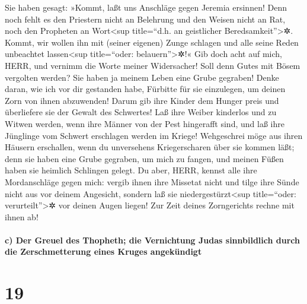 Sie haben gesagt: »Kommt, laßt uns Anschläge gegen
Jeremia ersinnen! Denn noch fehlt es den Priestern nicht an Belehrung
und den Weisen nicht an Rat, noch den Propheten an Wort\textless sup
title=``d.h. an geistlicher Beredsamkeit''\textgreater✲. Kommt, wir
wollen ihn mit (seiner eigenen) Zunge schlagen und alle seine Reden
unbeachtet lassen\textless sup title=``oder: belauern''\textgreater✲!«
Gib doch acht auf mich, HERR, und vernimm die Worte
meiner Widersacher! Soll denn Gutes mit Bösem vergolten
werden? Sie haben ja meinem Leben eine Grube gegraben! Denke daran, wie
ich vor dir gestanden habe, Fürbitte für sie einzulegen, um deinen Zorn
von ihnen abzuwenden! Darum gib ihre Kinder dem Hunger
preis und überliefere sie der Gewalt des Schwertes! Laß ihre Weiber
kinderlos und zu Witwen werden, wenn ihre Männer von der Pest hingerafft
sind, und laß ihre Jünglinge vom Schwert erschlagen werden im Kriege!
Wehgeschrei möge aus ihren Häusern erschallen, wenn du
unversehens Kriegerscharen über sie kommen läßt; denn sie haben eine
Grube gegraben, um mich zu fangen, und meinen Füßen haben sie heimlich
Schlingen gelegt. Du aber, HERR, kennst alle ihre
Mordanschläge gegen mich: vergib ihnen ihre Missetat nicht und tilge
ihre Sünde nicht aus vor deinem Angesicht, sondern laß sie
niedergestürzt\textless sup title=``oder: verurteilt''\textgreater✲ vor
deinen Augen liegen! Zur Zeit deines Zorngerichts rechne mit ihnen ab!

\hypertarget{c-der-greuel-des-thopheth-die-vernichtung-judas-sinnbildlich-durch-die-zerschmetterung-eines-kruges-angekuxfcndigt}{%
\paragraph{c) Der Greuel des Thopheth; die Vernichtung Judas
sinnbildlich durch die Zerschmetterung eines Kruges
angekündigt}\label{c-der-greuel-des-thopheth-die-vernichtung-judas-sinnbildlich-durch-die-zerschmetterung-eines-kruges-angekuxfcndigt}}

\hypertarget{section-18}{%
\section{19}\label{section-18}}

